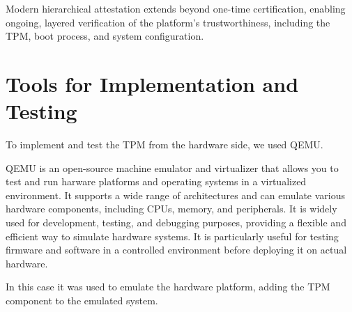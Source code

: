 Modern hierarchical attestation extends beyond one-time certification, 
enabling ongoing, layered verification of the platform’s 
trustworthiness, including the TPM, boot process, and system 
configuration.


\section{Tools for Implementation and Testing}
To implement and test the TPM from the hardware side, we used QEMU.

QEMU is an open-source machine emulator and virtualizer that 
allows you to test and run harware platforms and operating systems
in a virtualized environment.
It supports a wide range of architectures and can emulate various
hardware components, including CPUs, memory, and peripherals.
It is widely used for development, testing, and debugging purposes,
providing a flexible and efficient way to simulate hardware systems.
It is particularly useful for testing firmware and software in a 
controlled environment before deploying it on actual hardware.

In this case it was used to emulate the hardware platform, adding the 
TPM component to the emulated system. 